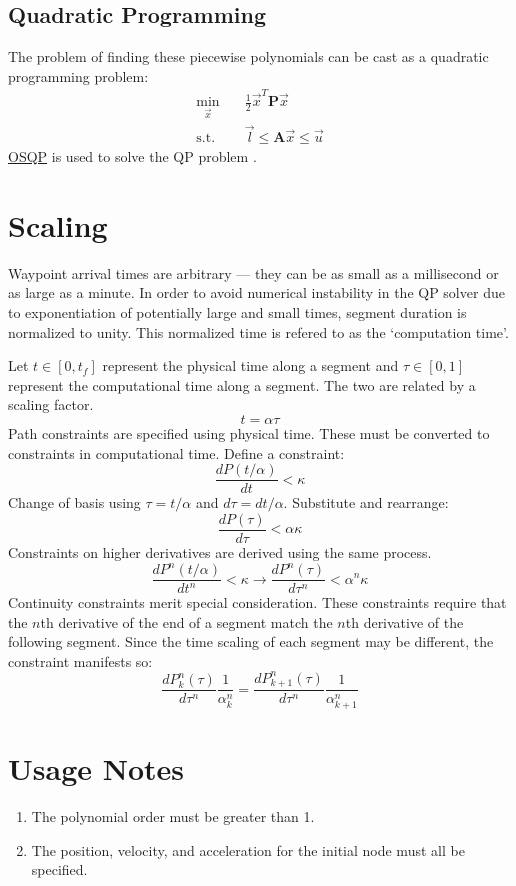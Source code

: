 \documentclass[12pt]{article}
\begin{document}
\subsection{Quadratic Programming}
The problem of finding these piecewise polynomials can be cast as a quadratic
programming problem:
%
\begin{equation}
  \begin{split}
    \min_{\vec{x}} \quad& \frac{1}{2} \vec{x}^T \mathbf{P} \vec{x}  \\
    \text{s.t.} \quad& \vec{l} \leq \mathbf{A} \vec{x} \leq \vec{u}
  \end{split}
\end{equation}
%
\href{https://osqp.org}{OSQP} is used to solve the QP problem \cite{osqp}.

\section{Scaling}
Waypoint arrival times are arbitrary --- they can be as small as a millisecond
or as large as a minute. In order to avoid numerical instability in the QP
solver due to exponentiation of potentially large and small times, segment
duration is normalized to unity. This normalized time is refered to as the
`computation time'.

Let $t \in [0, t_{f}]$ represent the physical time along a segment and $\tau \in
[0, 1]$ represent the computational time along a segment. The two are related by
a scaling factor.
%
\begin{equation}
  t = \alpha \tau
\end{equation}
%
Path constraints are specified using physical time. These must be converted to
constraints in computational time. Define a constraint:
%
\begin{equation}
  \frac{dP(t/\alpha)}{dt} < \kappa
\end{equation}
%
Change of basis using $\tau = t / \alpha$ and $d\tau = dt / \alpha$. Substitute
and rearrange:
%
\begin{equation}
  \frac{dP(\tau)}{d\tau} < \alpha \kappa
\end{equation}
%
Constraints on higher derivatives are derived using the same process.
\begin{equation}
  \frac{dP^{n}(t/\alpha)}{dt^{n}} < \kappa \rightarrow
  \frac{dP^{n}(\tau)}{d\tau^{n}} < \alpha^{n} \kappa
\end{equation}
%
Continuity constraints merit special consideration. These constraints require
that the $n$th derivative of the end of a segment match the $n$th derivative of
the following segment. Since the time scaling of each segment may be different,
the constraint manifests so:
\begin{equation}
  \frac{dP_{k}^{n}(\tau)}{d\tau^{n}} \frac{1}{\alpha_{k}^{n}} =
  \frac{dP_{k+1}^{n}(\tau)}{d\tau^{n}} \frac{1}{\alpha_{k+1}^{n}}
\end{equation}

\section{Usage Notes}
\begin{enumerate}
  \item The polynomial order must be greater than 1.
  \item The position, velocity, and acceleration for the initial node must all
    be specified. 
\end{enumerate}



\end{document}
